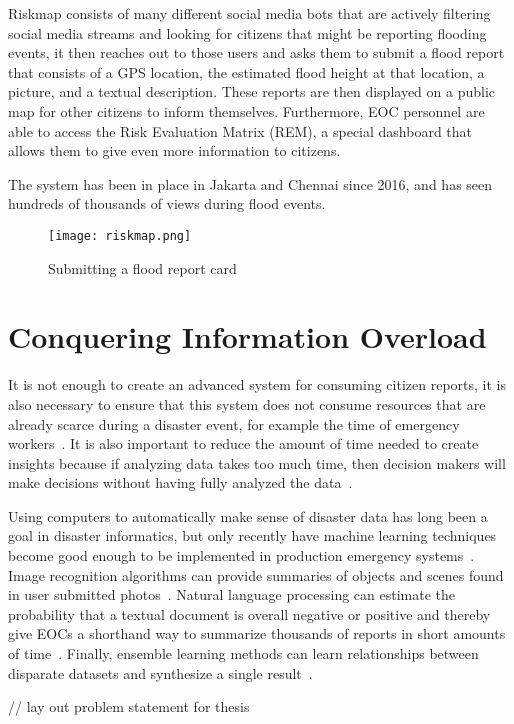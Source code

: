 	Riskmap consists of many different social media bots that are actively
	filtering social media streams and looking for citizens that might be
	reporting flooding events, it then reaches out to those users and asks
	them to submit a flood report that consists of a GPS location, the
	estimated flood height at that location, a picture, and a textual
	description. These reports are then displayed on a public map for other
	citizens to inform themselves. Furthermore, EOC personnel are able to
	access the Risk Evaluation Matrix (REM), a special dashboard that allows
	them to give even more information to citizens.

	The system has been in place in Jakarta and Chennai since 2016, and has
	seen hundreds of thousands of views during flood events.

	\begin{figure} \texttt{[image: riskmap.png]}
	\caption{Submitting a flood report card}\label{fig:cards} \end{figure}

\section{Conquering Information Overload} It is not enough to create an advanced
system for consuming citizen reports, it is also necessary to ensure that this
system does not consume resources that are already scarce during a disaster
event, for example the time of emergency
workers~\cite{aminDataNaturalDisasters2008}. It is also important to reduce the
amount of time needed to create insights because if analyzing data takes too
much time, then decision makers will make decisions without having fully
analyzed the data~\cite{quarantelliUrbanVulnerabilityDisasters2003}.

	Using computers to automatically make sense of disaster data has long
	been a goal in disaster informatics, but only recently have machine
	learning techniques become good enough to be implemented in production
	emergency systems~\cite{meierDigitalHumanitariansHow2015}. Image
	recognition algorithms can provide summaries of objects and scenes found
	in user submitted photos~\cite{nguyenRapidClassificationCrisisRelated,
	donahueDeCAFDeepConvolutional2013}. Natural language processing can
	estimate the probability that a textual document is overall negative or
	positive and thereby give EOCs a shorthand way to summarize thousands of
	reports in short amounts of
	time~\cite{nguyenRapidClassificationCrisisRelated,
	nagyCrowdSentimentDetection2012}. Finally, ensemble learning methods can
	learn relationships between disparate datasets and synthesize a single
	result~\cite{mouzannarDamageIdentificationSocial2018}.

	// lay out problem statement for thesis
